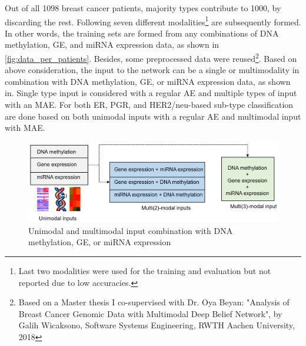 \hspace*{3.5mm} Out of all 1098 breast cancer patients, majority types contribute to 1000, by discarding the rest. Following seven different modalities\footnote{Last two modalities were used for the training and evaluation but not reported due to low accuracies.} are subsequently formed. In other words, the training sets are formed from any combinations of DNA methylation, GE, and miRNA expression data, as shown in \cref{fig:data_per_patients}. Besides, some preprocessed data were reused\footnote{Based on a Master thesis I co-supervised with Dr. Oya Beyan: "Analysis of Breast Cancer Genomic Data with Multimodal Deep Belief Network", by Galih Wicaksono, Software Systems Engineering, RWTH Aachen University, 2018}. Based on above consideration, the input to the network can be a single or multimodality in combination with DNA methylation, GE, or miRNA expression data, as shown in. Single type input is considered with a regular AE and multiple types of input with an MAE. For both ER, PGR, and HER2/neu-based sub-type classification are done based on both unimodal inputs with a regular AE and multimodal input with MAE. 

\begin{figure}
	\centering
	\includegraphics[scale=0.7]{images/input_combination.png}
	\caption[Different uni- and multi-modality input combination]{Unimodal and multimodal input combination with DNA methylation, GE, or miRNA expression}
	\label{fig:input_comb}
\end{figure}

